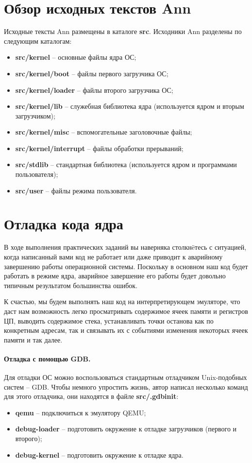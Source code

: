 \section{Обзор исходных текстов Ann}
Исходные тексты Ann размещены в каталоге \textbf{src}. Исходники Ann разделены
по следующим каталогам:
\begin{itemize}
\item \textbf{src/kernel} -- основные файлы ядра ОС;
\item \textbf{src/kernel/boot} -- файлы первого загрузчика ОС;
\item \textbf{src/kernel/loader} -- файлы второго загрузчика ОС;
\item \textbf{src/kernel/lib} -- служебная библиотека ядра (используется ядром
	и вторым загрузчиком);
\item \textbf{src/kernel/misc} -- вспомогательные заголовочные файлы;
\item \textbf{src/kernel/interrupt} -- файлы обработки прерываний;
\item \textbf{src/stdlib} -- стандартная библиотека (используется ядром и
	программами пользователя);
\item \textbf{src/user} -- файлы режима пользователя.
\end{itemize}

\section{Отладка кода ядра}
\label{sec:debug}
В ходе выполнения практических заданий вы наверняка столкнëтесь
с ситуацией, когда написанный вами код не работает или даже приводит к
аварийному завершению работы операционной системы. Поскольку в основном наш
код будет работать в режиме ядра, аварийное завершение его
работы будет довольно типичным результатом большинства ошибок.

К счастью, мы будем выполнять наш код на интерпретирующем эмуляторе,
что даст нам возможность легко просматривать содержимое ячеек
памяти и регистров ЦП, выводить содержимое стека, устанавливать точки
останова как по конкретным адресам, так и связывать их с событиями
изменения некоторых ячеек памяти и так далее.

\paragraph{Отладка с помощью GDB.} Для отладки ОС можно воспользоваться
стандартным отладчиком Unix-подобных систем -- GDB. Чтобы немного упростить
жизнь, автор написал несколько команд для этого отладчика, они находятся в
файле \textbf{src/.gdbinit}:
\begin{itemize}
\item \textbf{qemu} -- подключиться к эмулятору QEMU;
\item \textbf{debug-loader} -- подготовить окружение к отладке загрузчиков (первого и
	второго);
\item \textbf{debug-kernel} -- подготовить окружение к отладке ядра.
\end{itemize}

